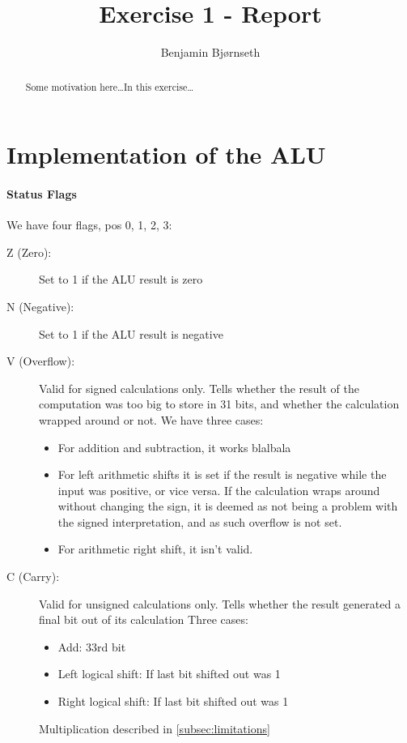 \documentclass{article}
\title{Exercise 1 - Report}
\author{Benjamin Bj\o rnseth}
\begin{document}
\maketitle
\begin{abstract}
Some motivation here\ldots In this exercise\ldots 
\end{abstract}
\section{Implementation of the ALU}
\label{sec:implementation}

\paragraph{Status Flags}
\label{flags}
We have four flags, pos 0, 1, 2, 3:
\begin{description}
\item[Z (Zero):] Set to 1 if the ALU result is zero
\item[N (Negative):] Set to 1 if the ALU result is negative
\item[V (Overflow):] Valid for signed calculations only. Tells whether the result of the computation was too big to store in 31 bits, and whether the calculation wrapped around or not. We have three cases:
\begin{itemize}
\item For addition and subtraction, it works blalbala
\item For left arithmetic shifts it is set if the result is negative while the input was positive, or vice versa. If the calculation wraps around without changing the sign, it is deemed as not being a problem with the signed interpretation, and as such overflow is not set.
\item  For arithmetic right shift, it isn't valid.
\end{itemize}
\item[C (Carry):] Valid for unsigned calculations only. Tells whether the result generated a final bit out of its calculation
Three cases:
\begin{itemize}
\item Add: 33rd bit
\item Left logical shift: If last bit shifted out was 1
\item Right logical shift: If last bit shifted out was 1
\end{itemize}
Multiplication described in \ref{subsec:limitations}
\end{description}
\end{document}
